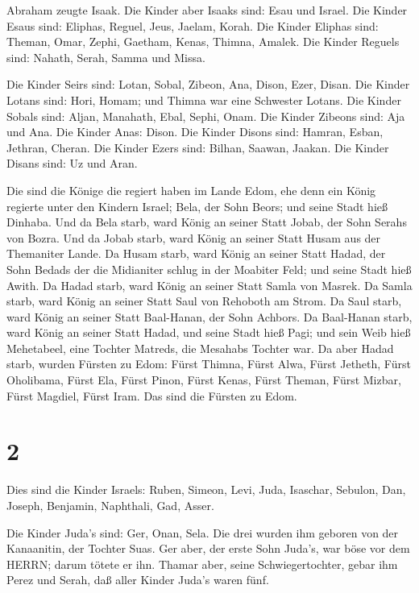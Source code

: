  Abraham zeugte Isaak. Die Kinder aber Isaaks sind: Esau
und Israel.  Die Kinder Esaus sind: Eliphas, Reguel, Jeus,
Jaelam, Korah.  Die Kinder Eliphas sind: Theman, Omar,
Zephi, Gaetham, Kenas, Thimna, Amalek.  Die Kinder Reguels
sind: Nahath, Serah, Samma und Missa.

 Die Kinder Seirs sind: Lotan, Sobal, Zibeon, Ana, Dison,
Ezer, Disan.  Die Kinder Lotans sind: Hori, Homam; und
Thimna war eine Schwester Lotans.  Die Kinder Sobals sind:
Aljan, Manahath, Ebal, Sephi, Onam. Die Kinder Zibeons sind: Aja und
Ana.  Die Kinder Anas: Dison. Die Kinder Disons sind:
Hamran, Esban, Jethran, Cheran.  Die Kinder Ezers sind:
Bilhan, Saawan, Jaakan. Die Kinder Disans sind: Uz und Aran.

 Die sind die Könige die regiert haben im Lande Edom, ehe
denn ein König regierte unter den Kindern Israel; Bela, der Sohn Beors;
und seine Stadt hieß Dinhaba.  Und da Bela starb, ward
König an seiner Statt Jobab, der Sohn Serahs von Bozra. 
Und da Jobab starb, ward König an seiner Statt Husam aus der Themaniter
Lande.  Da Husam starb, ward König an seiner Statt Hadad,
der Sohn Bedads der die Midianiter schlug in der Moabiter Feld; und
seine Stadt hieß Awith.  Da Hadad starb, ward König an
seiner Statt Samla von Masrek.  Da Samla starb, ward König
an seiner Statt Saul von Rehoboth am Strom.  Da Saul starb,
ward König an seiner Statt Baal-Hanan, der Sohn Achbors. 
Da Baal-Hanan starb, ward König an seiner Statt Hadad, und seine Stadt
hieß Pagi; und sein Weib hieß Mehetabeel, eine Tochter Matreds, die
Mesahabs Tochter war.  Da aber Hadad starb, wurden Fürsten
zu Edom: Fürst Thimna, Fürst Alwa, Fürst Jetheth,  Fürst
Oholibama, Fürst Ela, Fürst Pinon,  Fürst Kenas, Fürst
Theman, Fürst Mizbar,  Fürst Magdiel, Fürst Iram. Das sind
die Fürsten zu Edom.

\hypertarget{section-1}{%
\section{2}\label{section-1}}

 Dies sind die Kinder Israels: Ruben, Simeon, Levi, Juda,
Isaschar, Sebulon,  Dan, Joseph, Benjamin, Naphthali, Gad,
Asser.

 Die Kinder Juda's sind: Ger, Onan, Sela. Die drei wurden
ihm geboren von der Kanaanitin, der Tochter Suas. Ger aber, der erste
Sohn Juda's, war böse vor dem HERRN; darum tötete er ihn. 
Thamar aber, seine Schwiegertochter, gebar ihm Perez und Serah, daß
aller Kinder Juda's waren fünf.

